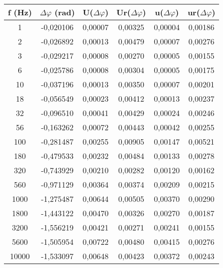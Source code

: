 \begin{table}[!ht]
    \centering
    \begin{tabular}{|c|c|c|c|c|c|}
    \hline
        \textbf{f (Hz)} & \textbf{$\Delta\varphi$ (rad)} & \textbf{U($\Delta\varphi$)} & \textbf{Ur($\Delta\varphi$)} & \textbf{u($\Delta\varphi$)} & \textbf{ur($\Delta\varphi$)} \\ \hline
        1 & -0,020106 & 0,00007 & 0,00325 & 0,00004 & 0,00186 \\ \hline
        2 & -0,026892 & 0,00013 & 0,00479 & 0,00007 & 0,00276 \\ \hline
        3 & -0,029217 & 0,00008 & 0,00270 & 0,00005 & 0,00155 \\ \hline
        6 & -0,025786 & 0,00008 & 0,00304 & 0,00005 & 0,00175 \\ \hline
        10 & -0,037196 & 0,00013 & 0,00350 & 0,00007 & 0,00201 \\ \hline
        18 & -0,056549 & 0,00023 & 0,00412 & 0,00013 & 0,00237 \\ \hline
        32 & -0,096510 & 0,00041 & 0,00429 & 0,00024 & 0,00246 \\ \hline
        56 & -0,163262 & 0,00072 & 0,00443 & 0,00042 & 0,00255 \\ \hline
        100 & -0,281487 & 0,00255 & 0,00905 & 0,00147 & 0,00521 \\ \hline
        180 & -0,479533 & 0,00232 & 0,00484 & 0,00133 & 0,00278 \\ \hline
        320 & -0,743929 & 0,00210 & 0,00282 & 0,00120 & 0,00162 \\ \hline
        560 & -0,971129 & 0,00364 & 0,00374 & 0,00209 & 0,00215 \\ \hline
        1000 & -1,275487 & 0,00644 & 0,00505 & 0,00370 & 0,00290 \\ \hline
        1800 & -1,443122 & 0,00470 & 0,00326 & 0,00270 & 0,00187 \\ \hline
        3200 & -1,556219 & 0,00421 & 0,00271 & 0,00241 & 0,00155 \\ \hline
        5600 & -1,505954 & 0,00722 & 0,00480 & 0,00415 & 0,00276 \\ \hline
        10000 & -1,533097 & 0,00648 & 0,00423 & 0,00372 & 0,00243 \\ \hline
    \end{tabular}
\end{table}
\FloatBarrier
\clearpage